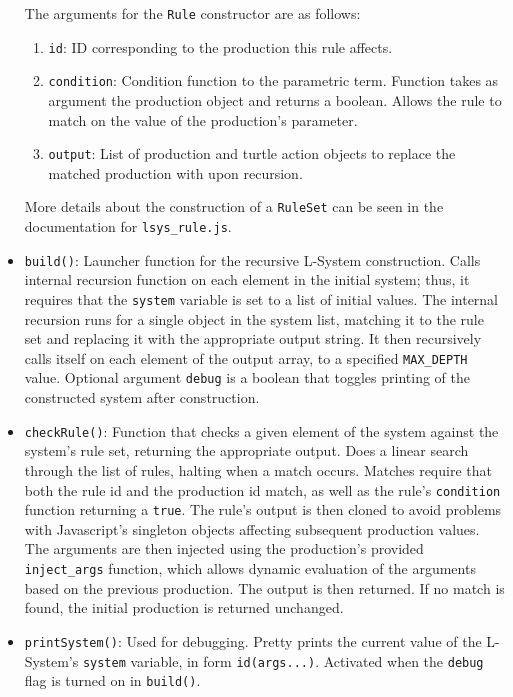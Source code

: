 \documentclass{article}
\begin{document}
\begin{itemize}
\begin{enumerate}
    \end{enumerate}
The arguments for the \verb|Rule| constructor are as follows:
    \begin{enumerate}
        \item \verb|id|: ID corresponding to the production this rule affects.
        \item \verb|condition|: Condition function to the parametric term. Function takes as
    argument the production object and returns a boolean. Allows the rule to match on the
    value of the production's parameter. 
        \item \verb|output|: List of production and turtle action objects to replace the matched
    production with upon recursion. 

    \end{enumerate}
More details about the construction of a \verb|RuleSet| can be seen in the documentation for
\verb|lsys_rule.js|.

    \item \verb|build()|: Launcher function for the recursive L-System construction. Calls internal
recursion function on each element in the initial system; thus, it requires that the \verb|system|
variable is set to a list of initial values. The internal recursion runs for a single object in the
system list, matching it to the rule set and replacing it with the appropriate output string. It
then recursively calls itself on each element of the output array, to a specified \verb|MAX_DEPTH|
value. Optional argument \verb|debug| is a boolean that toggles printing of the constructed system
after construction.

    \item \verb|checkRule()|: Function that checks a given element of the system against the
system's rule set, returning the appropriate output. Does a linear search through the list of
rules, halting when a match occurs. Matches require that both the rule id and the production id
match, as well as the rule's \verb|condition| function returning a \verb|true|. The rule's output
is then cloned to avoid problems with Javascript's singleton objects affecting subsequent
production values. The arguments are then injected using the production's provided
\verb|inject_args| function, which allows dynamic evaluation of the arguments based on the
previous production. The output is then returned. If no match is found, the initial production is
returned unchanged.

    \item \verb|printSystem()|: Used for debugging. Pretty prints the current value of the
L-System's \verb|system| variable, in form \verb|id(args...)|. Activated when the \verb|debug| flag is
turned on in \verb|build()|.

\end{itemize}
\end{document}
